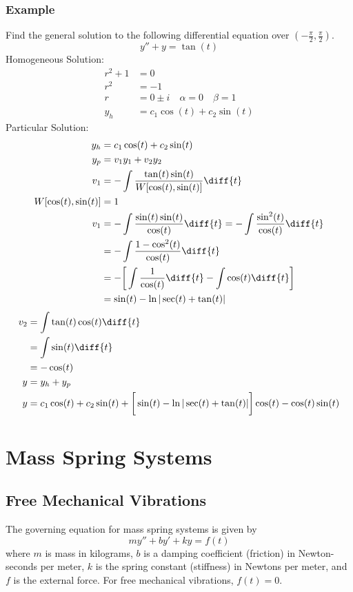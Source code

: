 \documentclass{math}
\begin{document}
\subsubsection*{Example}
Find the general solution to the following differential equation over
\( (-\frac{\pi}{2},\frac{\pi}{2}) \).
\[ y''+y = \tan(t) \]
Homogeneous Solution:
\begin{align*}
  r^2+1 &= 0 \\
  r^2 &= -1 \\
  r &= 0\pm i \quad \alpha = 0 \quad \beta = 1 \\
  y_h &= c_1\cos(t)+c_2\sin(t)
\end{align*}
Particular Solution:
\begin{align*}
  y_h &= c_1\cos(t)+c_2\sin(t) \\
  y_p &= v_1y_1+v_2y_2 \\
  v_1 &= -\int\frac{\tan(t)\sin(t)}{W[\cos(t),\sin(t)]}\diff{t} \\
  W[\cos(t),\sin(t)] &= 1 \\
  v_1 &= -\int\frac{\sin(t)\sin(t)}{\cos(t)}\diff{t} =
    -\int\frac{\sin^2(t)}{\cos(t)}\diff{t} \\
  &= -\int\frac{1-\cos^2(t)}{\cos(t)}\diff{t} \\
  &= -\bigg[\int\frac{1}{\cos(t)}\diff{t}-\int\cos(t)\diff{t}\bigg] \\
  &= \sin(t)-\ln|\sec(t)+\tan(t)|
\end{align*}
\begin{align*}
  v_2 &= \int\tan(t)\cos(t)\diff{t} \\
  &= \int\sin(t)\diff{t} \\
  &= -\cos(t) \\
  y &= y_h+y_p \\
  y &= c_1\cos(t)+c_2\sin(t)+\bigg[\sin(t)-\ln|\sec(t)+\tan(t)|\bigg]\cos(t)-
    \cos(t)\sin(t)
\end{align*}

\clearpage
\section*{Mass Spring Systems}

\subsection*{Free Mechanical Vibrations}
The governing equation for mass spring systems is given by
\[ my''+by'+ky = f(t) \]
where \( m \) is mass in kilograms, \( b \) is a damping coefficient (friction)
in Newton-seconds per meter, \( k \) is the spring constant (stiffness)
in Newtons per meter, and \( f \) is the external force. For free mechanical
vibrations, \( f(t) = 0 \).
\end{document}
